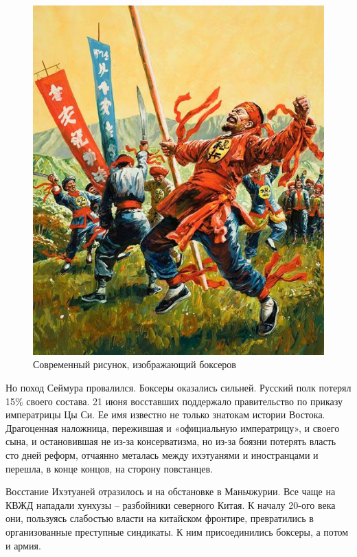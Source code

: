 \begin{figure}[h!tb] 
	\centering\includegraphics[scale=0.5]{Data/RYAV_predposylki/uWfCsUtq3gw.jpg}
	\caption{Современный рисунок, изображающий боксеров
	}%
\end{figure}

Но поход Сеймура провалился. Боксеры оказались сильней. Русский полк потерял 15\% своего состава.
21 июня восставших поддержало правительство по приказу императрицы Цы Си. Ее имя известно не только знатокам истории Востока. Драгоценная наложница, пережившая и «официальную императрицу», и своего сына, и остановившая не из-за консерватизма, но из-за боязни потерять власть сто дней реформ, отчаянно металась между ихэтуанями и иностранцами и перешла, в конце концов, на сторону повстанцев.

Восстание Ихэтуаней отразилось и на обстановке в Маньчжурии. Все чаще на КВЖД нападали хунхузы – разбойники северного Китая. К началу 20-ого века они, пользуясь слабостью власти на китайском фронтире, превратились в организованные преступные синдикаты. К ним присоединились боксеры, а потом и армия.

